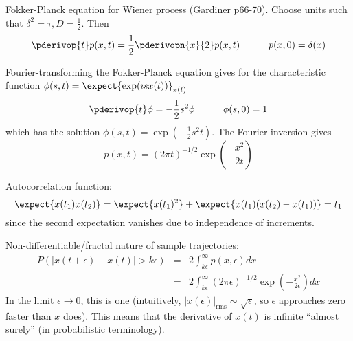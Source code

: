 \documentclass{beamer}
\begin{document}
\begin{frame}{}
 
  Fokker-Planck equation for Wiener process (Gardiner p66-70). Choose units such that $\delta^2 = \tau, D=\frac{1}{2}$.
Then
\[
\pderivop{t} p(x,t) = \frac{1}{2} \pderivopn{x}{2} p(x,t)
\quad\quad\quad
p(x,0) = \delta(x)
\]
\end{frame}
\begin{frame}{}
  Fourier-transforming the Fokker-Planck equation gives for the characteristic function
$\phi(s,t) = \expect{\exp(\imath sx(t))}_{x(t)}$
\[
\pderivop{t} \phi = -\frac{1}{2} s^2 \phi
\quad\quad\quad
\phi(s,0) = 1
\]
which has the solution $\phi(s,t) = \exp(-\frac{1}{2}s^2 t)$.
The Fourier inversion gives
\[
p(x,t) = (2\pi t)^{-1/2} \exp \left( -\frac{x^2}{2t} \right)
\]
\end{frame}
\begin{frame}{}
  Autocorrelation function:
\[
\expect{x(t_1)x(t_2)} = \expect{x(t_1)^2} + \expect{x(t_1)(x(t_2)-x(t_1))} = t_1
\]
since the second expectation vanishes due to independence of increments.
\end{frame}
\begin{frame}{}
  Non-differentiable/fractal nature of sample trajectories:
\begin{eqnarray*}
P(|x(t+\epsilon) - x(t)| > k\epsilon) & = & 2\int_{k\epsilon}^\infty p(x,\epsilon) dx \\
& = & 2\int_{k\epsilon}^\infty (2\pi \epsilon)^{-1/2} \exp \left( -\frac{x^2}{2\epsilon} \right) dx
\end{eqnarray*}
In the limit $\epsilon \to 0$, this is one
(intuitively, $|x(\epsilon)|_{\mbox{rms}} \sim \sqrt{\epsilon}$, so $\epsilon$ approaches zero faster than $x$ does).
This means that the derivative of $x(t)$ is infinite  ``almost surely'' (in probabilistic terminology).
\end{frame}
%
\end{document}
